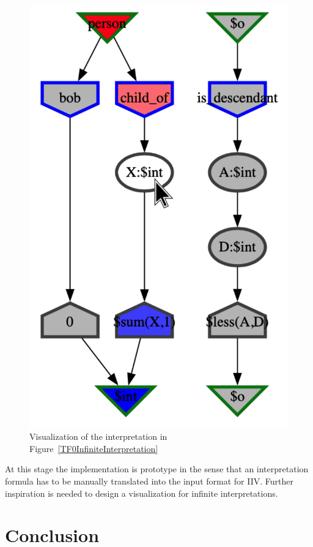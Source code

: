 \documentclass[letterpaper]{article}
\begin{document}
\begin{figure}[htbp]
\includegraphics[width=\columnwidth]{TFF_Integer.s.IIV.pdf}
\caption{Visualization of the interpretation in Figure~\ref{TF0InfiniteInterpretation}}
\label{TF0InfiniteIIV}
\end{figure}

At this stage the implementation is prototype in the sense that an interpretation formula
has to be manually translated into the input format for IIV.
Further inspiration is needed to design a visualization for infinite interpretations.

\section{Conclusion}
\label{Conclusion}



\end{document}
